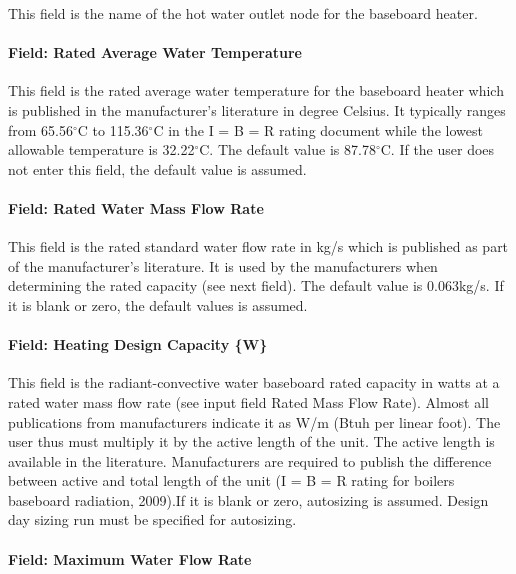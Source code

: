 This field is the name of the hot water outlet node for the baseboard heater.

\paragraph{Field: Rated Average Water Temperature}\label{field-rated-averagewatertemperature}

This field is the rated average water temperature for the baseboard heater which is published in the manufacturer's literature in degree Celsius. It typically ranges from 65.56$^\circ$C to 115.36$^\circ$C in the I = B = R rating document while the lowest allowable temperature is 32.22$^\circ$C. The default value is 87.78$^\circ$C. If the user does not enter this field, the default value is assumed.

\paragraph{Field: Rated Water Mass Flow Rate}

This field is the rated standard water flow rate in kg/s which is published as part of the manufacturer's literature. It is used by the manufacturers when determining the rated capacity (see next field). The default value is 0.063kg/s. If it is blank or zero, the default values is assumed.

\paragraph{Field: Heating Design Capacity \{W\}}\label{field-heating-design-capacity-w-000}

This field is the radiant-convective water baseboard rated capacity in watts at a rated water mass flow rate (see input field Rated Mass Flow Rate). Almost all publications from manufacturers indicate it as W/m (Btuh per linear foot). The user thus must multiply it by the active length of the unit. The active length is available in the literature. Manufacturers are required to publish the difference between active and total length of the unit (I = B = R rating for boilers baseboard radiation, 2009).If it is blank or zero, autosizing is assumed. Design day sizing run must be specified for autosizing.

\paragraph{Field: Maximum Water Flow Rate}\label{field-maximum-water-flow-rate-001}

